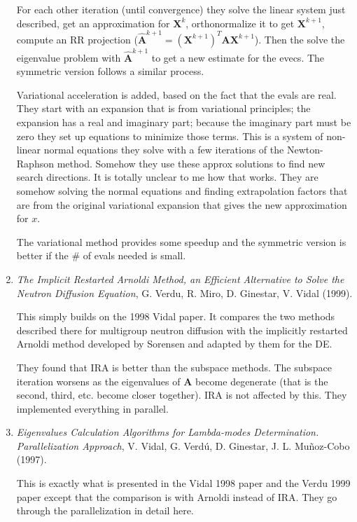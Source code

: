 \documentclass[12pt,twoside]{book}
\newcommand{\ve}[1]{\ensuremath{\mathbf{#1}}}
\begin{document}
\begin{enumerate}
  For each other iteration (until convergence) they solve the linear system just described, get an approximation for $\ve{X}^k$, orthonormalize it to get $\ve{X}^{k+1}$, compute an RR projection ($\hat{\ve{A}}^{k+1} = (\ve{X}^{k+1})^T \ve{AX}^{k+1}$). Then the solve the eigenvalue problem with $\hat{\ve{A}}^{k+1}$ to get a new estimate for the evecs. The symmetric version follows a similar process.

  Variational acceleration is added, based on the fact that the evals are real. They start with an expansion that is from variational principles; the expansion has a real and imaginary part; because the imaginary part must be zero they set up equations to minimize those terms. This is a system of non-linear normal equations they solve with a few iterations of the Newton-Raphson method. Somehow they use these approx solutions to find new search directions. It is totally unclear to me how that works. They are somehow solving the normal equations and finding extrapolation factors that are from the original variational expansion that gives the new approximation for $x$.

  The variational method provides some speedup and the symmetric version is better if the \# of evals needed is small. 

\item \emph{The Implicit Restarted Arnoldi Method, an Efficient Alternative to Solve the Neutron Diffusion Equation}, G. Verdu, R. Miro, D. Ginestar, V. Vidal (1999).

  This simply builds on the 1998 Vidal paper. It compares the two methods described there for multigroup neutron diffusion with the implicitly restarted Arnoldi method developed by Sorensen and adapted by them for the DE.

  They found that IRA is better than the subspace methods. The subspace iteration worsens as the eigenvalues of $\ve{A}$ become degenerate (that is the second, third, etc. become closer together). IRA is not affected by this. They implemented everything in parallel.

\item \emph{Eigenvalues Calculation Algorithms for Lambda-modes Determination. Parallelization Approach}, V. Vidal, G. Verdú, D. Ginestar, J. L. Muñoz-Cobo (1997).

This is exactly what is presented in the Vidal 1998 paper and the Verdu 1999 paper except that the comparison is with Arnoldi instead of IRA. They go through the parallelization in detail here.


\end{enumerate}
\end{document}
